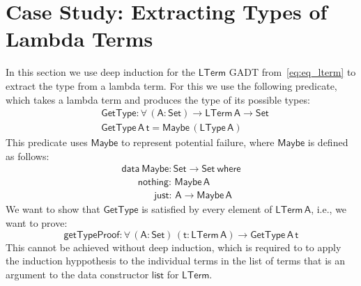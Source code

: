 \documentclass[9pt]{entcs}
\begin{document}
\section{Case Study: Extracting Types of Lambda Terms}\label{sec:app}

In this section we use deep induction for the $\mathsf{LTerm}$ GADT
from~\eqref{eq:eq_lterm} to extract the type from a lambda term.  For
this we use the following predicate, which takes a lambda term and
produces the type of its possible types:
\begin{align*}
  &\mathsf{GetType : \forall \, (A : Set) \to LTerm\,A \to Set} \\
  &\mathsf{GetType \,A \,t = Maybe \, (LType \, A)}
\end{align*}
This predicate uses $\mathsf{Maybe}$ to represent potential failure,
where $\mathsf{Maybe}$ is defined as follows:
\begin{equation}\label{eq:maybe}
\begin{array}{l}
\mathsf{data\ Maybe : Set \to Set\ where}\\
\mathsf{\;\;\;\;\;\;nothing :\, Maybe\,A}\\
\mathsf{\;\;\;\;\;\;\;\;\;\;\;\;just :\, A \to Maybe\,A}
\end{array}
\end{equation}
We want to show that $\mathsf{GetType}$ is satisfied by every element
of $\mathsf{LTerm\,A}$, i.e., we want to prove:
\[ \mathsf{getTypeProof : \forall \, (A : Set)\, (t : LTerm\,A) \to
   GetType \,A \,t}\] This cannot be achieved without deep induction,
which is required to to apply the induction hyppothesis to the
individual terms in the list of terms that is an argument to the data
constructor $\mathsf{list}$ for $\mathsf{LTerm}$.
\end{document}
